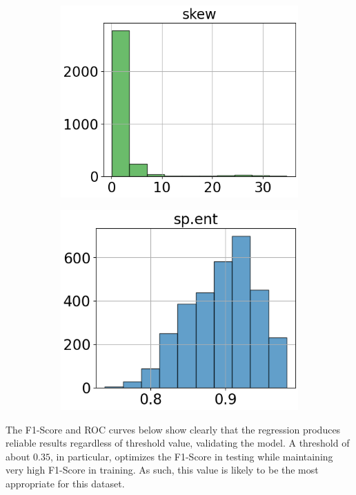 \begin{figure}[htbp]
\begin{subfigure}[t]{.24\textwidth}
        \includegraphics[width=\linewidth]{../../python_code/plots/logistic_regression/histogram-skew.png}
    \end{subfigure}
    \begin{subfigure}[t]{.24\textwidth}
        \centering 
        \includegraphics[width=\linewidth]{../../python_code/plots/logistic_regression/histogram-sp.ent.png}
    \end{subfigure}
\end{figure}

The F1-Score and ROC curves below show clearly that 
the regression produces reliable results regardless of threshold value, validating the model.
A threshold of about $0.35$, in particular, 
optimizes the F1-Score in testing while maintaining very high F1-Score in training.
As such, this value is likely to be the most appropriate for this dataset.

